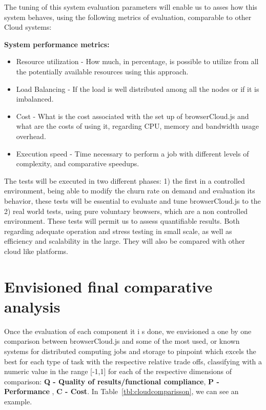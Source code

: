 The tuning of this system evaluation parameters will enable us to asses how this system behaves, using the following metrics of evaluation, comparable to other Cloud systems:

\textbf{System performance metrics:}
\begin{itemize}
  \item Resource utilization - How much, in percentage, is possible to utilize from all the potentially available resources using this approach.
  \item Load Balancing - If the load is well distributed among all the nodes or if it is imbalanced.
  \item Cost - What is the cost associated with the set up of browserCloud.js and what are the costs of using it, regarding CPU, memory and bandwidth usage overhead.
  \item Execution speed - Time necessary to perform a job with different levels of complexity, and comparative speedups.
\end{itemize}

The tests will be executed in two different phases: 1) the first in a controlled environment, being able to modify the churn rate on demand and evaluation its behavior, these tests will be essential to evaluate and tune browserCloud.js to the 2) real world tests, using pure voluntary browsers, which are a non controlled environment. These tests will permit us to assess quantifiable results. Both regarding adequate operation and stress testing in small scale, as well as efficiency and scalability in the large. They will also be compared with other cloud like platforms.

\section{Envisioned final comparative analysis}

Once the evaluation of each component it i s done, we envisioned a one by one comparison between browserCloud.js and some of the most used, or known systems for distributed computing jobs and storage to pinpoint which excels the best for each type of task with the respective relative trade offs, classifying with a numeric value in the range [-1,1] for each of the respective dimensions of comparison: \textbf{Q - Quality of results/functional compliance}, \textbf{P - Performance} , \textbf{C - Cost}. In Table~\ref{tbl:cloudcomparisson}, we can see an example.

